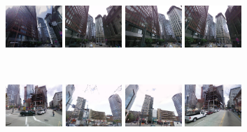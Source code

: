 \begin{minipage}{0.75\linewidth}
    \begin{minipage}{\linewidth} 
        \colorbox{myGreen}{\includegraphics[height=16mm]{imgs/ex1/FVsvm1.jpg}}
        \colorbox{myGreen}{\includegraphics[height=16mm]{imgs/ex1/FVsvm2.jpg}}
        \colorbox{myGreen}{\includegraphics[height=16mm]{imgs/ex1/FVsvm3.jpg}}
        \colorbox{myGreen}{\includegraphics[height=16mm]{imgs/ex1/FVsvm4.jpg}}
    \end{minipage}
    \\
    \begin{minipage}{\linewidth}
        \colorbox{myRed}{\includegraphics[height=16mm]{imgs/ex1/FV1.jpg}}
        \colorbox{myRed}{\includegraphics[height=16mm]{imgs/ex1/FV2.jpg}}
        \colorbox{myRed}{\includegraphics[height=16mm]{imgs/ex1/FV3.jpg}}
        \colorbox{myRed}{\includegraphics[height=16mm]{imgs/ex1/FV4.jpg}}
    \end{minipage} 
\end{minipage}
